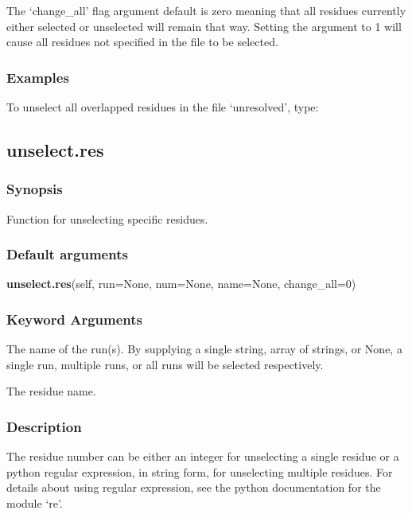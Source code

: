 The `change\_all' flag argument default is zero meaning that all residues currently either
selected or unselected will remain that way.  Setting the argument to 1 will cause all
residues not specified in the file to be selected.


\subsubsection{Examples}

To unselect all overlapped residues in the file `unresolved', type:




\newpage

\subsection{unselect.res}


\subsubsection{Synopsis}

Function for unselecting specific residues.

\subsubsection{Default arguments}

\textsf{\textbf{unselect.res}(self, run=None, num=None, name=None, change\_all=0)}


\subsubsection{Keyword Arguments}

  The name of the run(s).  By supplying a single string, array of strings, or None, a single run, multiple runs, or all runs will be selected respectively.

  The residue name.


\subsubsection{Description}

The residue number can be either an integer for unselecting a single residue or a python
regular expression, in string form, for unselecting multiple residues.  For details about
using regular expression, see the python documentation for the module `re'.


